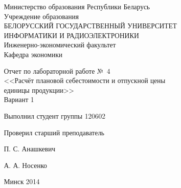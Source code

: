 \thispagestyle{empty}
\setlength{\parindent}{0ex} %

\begin{center}
  Министерство образования Республики Беларусь \\
  \smallskip
  Учреждение образования \\
  БЕЛОРУССКИЙ ГОСУДАРСТВЕННЫЙ УНИВЕРСИТЕТ \\
  ИНФОРМАТИКИ И РАДИОЭЛЕКТРОНИКИ \\
  \smallskip
  Инженерно-экономический факультет \\
  \smallskip
  Кафедра экономики
\end{center}

\vspace{40mm}

\begin{center}
  Отчет по лабораторной работе №~4 \\
  <<Расчёт плановой себестоимости и отпускной цены \\
  единицы продукции>> \\
  Вариант 1
\end{center}

\vspace{60mm}

\begin{minipage}{.55\linewidth}

  Выполнил студент группы 120602

  \smallskip

  Проверил старший преподаватель

\end{minipage}
\hfill
\begin{minipage}{.4\linewidth}
  \begin{flushright}

    П. С. Анашкевич

    \smallskip

    А. А. Носенко

  \end{flushright}
\end{minipage}

\vspace{49mm}

\begin{center}

  Минск 2014

\end{center}

\setlength{\parindent}{5ex} %
